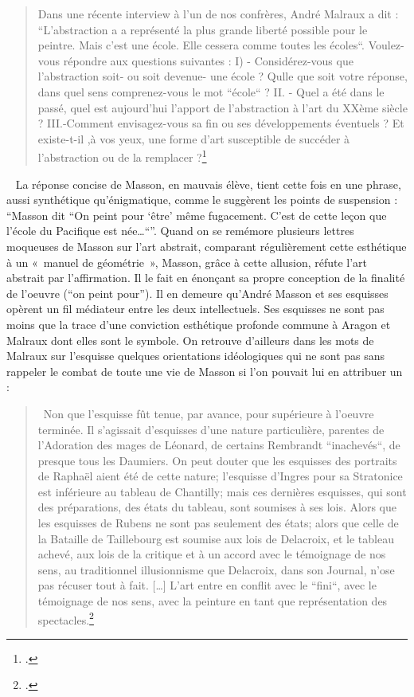\begin{quote}
Dans une récente interview à l’un de nos confrères, André Malraux a dit : “L’abstraction a a représenté la plus grande liberté possible pour le peintre. Mais c’est une école. Elle cessera comme toutes les écoles“. Voulez-vous répondre aux questions suivantes :  I) - Considérez-vous que l’abstraction soit- ou soit devenue- une école ? Qulle que soit votre réponse, dans quel sens comprenez-vous le mot “école“ ?  II. - Quel a  été dans le passé, quel est aujourd’hui l’apport de l’abstraction à l’art du XXème siècle ? III.-Comment envisagez-vous sa fin ou ses développements éventuels ? Et existe-t-il ,à vos yeux, une forme d’art susceptible de succéder à l’abstraction ou de la remplacer ?\footcite{avantgarde}
\end{quote}
 
	 La réponse concise de Masson, en mauvais élève, tient cette fois en une phrase, aussi synthétique qu’énigmatique, comme le suggèrent les points de suspension : \enquote{Masson dit “On peint pour \enquote{être} même fugacement. C’est de cette leçon que l’école du Pacifique est née…“}. Quand on se remémore plusieurs lettres moqueuses de Masson sur l’art abstrait, comparant régulièrement cette esthétique à un « manuel de géométrie », Masson, grâce à cette allusion, réfute l’art abstrait par l’affirmation. Il le fait en énonçant sa propre conception de la finalité de l’oeuvre (\enquote{on peint pour}). Il en demeure qu'André Masson et ses esquisses opèrent un fil médiateur entre les deux intellectuels. Ses esquisses ne sont pas moins que la trace d'une conviction esthétique profonde commune à Aragon et Malraux dont elles sont le symbole. On retrouve d'ailleurs dans les mots de Malraux sur l'esquisse quelques orientations idéologiques qui ne sont pas sans rappeler le combat de toute une vie de Masson si l'on pouvait lui en attribuer un : 

	 \begin{quote}
	 Non que l’esquisse fût tenue, par avance, pour supérieure à l’oeuvre terminée. Il s’agissait d’esquisses d’une nature particulière, parentes de l’Adoration des mages de Léonard, de certains Rembrandt “inachevés“, de presque tous les Daumiers. On peut douter que les esquisses des portraits de Raphaël aient été de cette nature; l’esquisse d’Ingres pour sa Stratonice est inférieure au tableau de Chantilly; mais ces dernières esquisses, qui sont des préparations, des états du tableau, sont soumises à ses lois. Alors que les esquisses de Rubens ne sont pas seulement des états; alors que celle de la Bataille  de Taillebourg est soumise aux lois de Delacroix, et le tableau achevé, aux lois de la critique et à un accord avec le témoignage de nos sens, au traditionnel illusionnisme que Delacroix, dans son Journal, n’ose pas récuser tout à fait. […] L’art entre en conflit avec le “fini“, avec le témoignage de nos sens, avec la peinture en tant que représentation des spectacles.\footcite[p56]{museeimaginaire}\end{quote}

